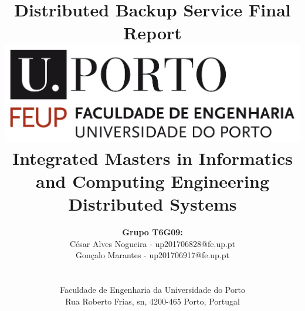 \documentclass[a4paper]{article}
\begin{document}
\setlength{\textwidth}{16cm}
\setlength{\textheight}{22cm}

\title{\Huge\textbf{Distributed Backup Service}\linebreak\linebreak\linebreak
\Large\textbf{Final Report}\linebreak\linebreak
\linebreak\linebreak
\includegraphics[scale=0.1]{feup-logo.png}\linebreak\linebreak
\linebreak\linebreak
\Large{Integrated Masters in Informatics and Computing Engineering} \linebreak\linebreak
\Large{Distributed Systems}\linebreak
}

\author{\textbf{Grupo T6G09:}\\ César Alves Nogueira - up201706828@fe.up.pt \\ Gonçalo Marantes - up201706917@fe.up.pt \\\linebreak\linebreak \\
 \\ Faculdade de Engenharia da Universidade do Porto \\ Rua Roberto Frias, s\/n, 4200-465 Porto, Portugal \linebreak\linebreak\linebreak
\linebreak\linebreak\vspace{1cm}}
\maketitle
\thispagestyle{empty}
\end{document}

